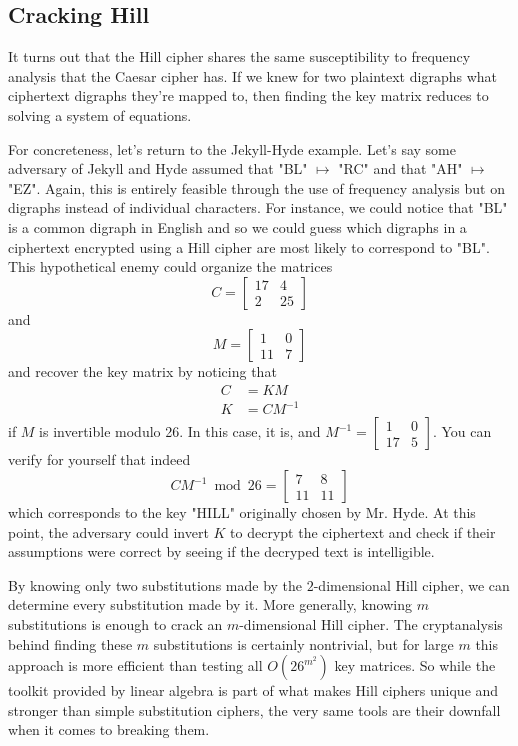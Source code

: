 \documentclass{paper}
\begin{document}
\subsection{Cracking Hill}
It turns out that the Hill cipher shares the same susceptibility to frequency analysis that the Caesar cipher has. If we knew for two plaintext digraphs what ciphertext digraphs they're mapped to, then finding the key matrix reduces to solving a system of equations. 

\medskip
For concreteness, let's return to the Jekyll-Hyde example. Let's say some adversary of Jekyll and Hyde assumed that "BL" $\mapsto$ "RC" and that "AH" $\mapsto$ "EZ". Again, this is entirely feasible through the use of frequency analysis but on digraphs instead of individual characters. For instance, we could notice that "BL" is a common digraph in English and so we could guess which digraphs in a ciphertext encrypted using a Hill cipher are most likely to correspond to "BL". This hypothetical enemy could organize the matrices \[ C = \begin{bmatrix}17 & 4 \\ 2 & 25\end{bmatrix}  \] and \[ M = \begin{bmatrix}1 & 0 \\ 11 & 7\end{bmatrix} \] and recover the key matrix by noticing that 
\begin{equation*}
    \begin{split}
            C  & = KM \\
            K & = CM^{-1}
    \end{split}
\end{equation*}
if $M$ is invertible modulo 26. In this case, it is, and $M^{-1} = \begin{bmatrix}1 & 0 \\ 17 & 5\end{bmatrix}$. You can verify for yourself that indeed \[ CM^{-1} \bmod 26 = \begin{bmatrix}7 & 8 \\ 11 & 11\end{bmatrix} \] which corresponds to the key "HILL" originally chosen by Mr. Hyde. At this point, the adversary could invert $K$ to decrypt the ciphertext and check if their assumptions were correct by seeing if the decryped text is intelligible. 

\medskip 
By knowing only two substitutions made by the $2$-dimensional Hill cipher, we can determine every substitution made by it. More generally, knowing $m$ substitutions is enough to crack an $m$-dimensional Hill cipher. The cryptanalysis behind finding these $m$ substitutions is certainly nontrivial, but for large $m$ this approach is more efficient than testing all $O(26^{m^2})$ key matrices. So while the toolkit provided by linear algebra is part of what makes Hill ciphers unique and stronger than simple substitution ciphers, the very same tools are their downfall when it comes to breaking them.
\end{document}
